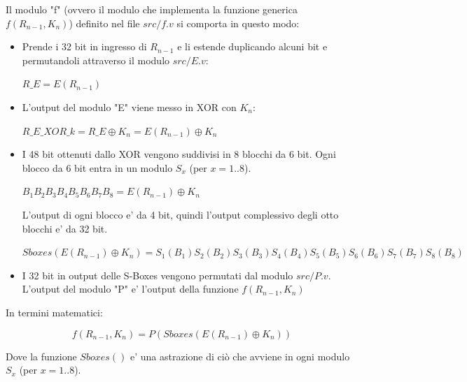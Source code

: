 \documentclass[a4paper]{article}
\begin{document}
Il modulo "f" (ovvero il modulo che implementa la funzione generica $f(R_{n-1}, K_n)$) definito nel file $src/f.v$ si comporta in questo modo:
\begin{itemize}
    \item Prende i 32 bit in ingresso di $R_{n-1}$ e li estende duplicando alcuni bit e permutandoli attraverso il modulo $src/E.v$:
          
          $R\_E = E(R_{n-1})$

    \item L'output del modulo "E" viene messo in XOR con $K_n$: 
    
          $R\_E\_XOR\_k = R\_E \oplus K_n = E(R_{n-1}) \oplus K_n$
    
    \item I 48 bit ottenuti dallo XOR vengono suddivisi in 8 blocchi da 6 bit. Ogni blocco da 6 bit entra in un modulo $S_x$ (per $x = 1 .. 8$).

          $B_1B_2B_3B_4B_5B_6B_7B_8 = E(R_{n-1}) \oplus K_n$



          L'output di ogni blocco e' da 4 bit, quindi l'output complessivo degli otto blocchi e' da 32 bit.

          $Sboxes(E(R_{n-1}) \oplus K_n) = S_1(B_1)S_2(B_2)S_3(B_3)S_4(B_4)S_5(B_5)S_6(B_6)S_7(B_7)S_8(B_8)$

    \item I 32 bit in output delle S-Boxes vengono permutati dal modulo $src/P.v$. L'output del modulo "P" e' l'output della funzione $f(R_{n-1}, K_n)$

\end{itemize}

In termini matematici:

$$f(R_{n-1}, K_n) = P(Sboxes(E(R_{n-1}) \oplus K_n))$$

Dove la funzione $Sboxes()$ e' una astrazione di ciò che avviene in ogni modulo $S_x$ (per $x = 1 .. 8$).



\end{document}
